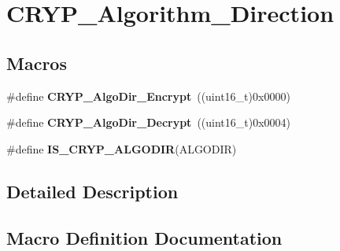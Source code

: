 \hypertarget{group___c_r_y_p___algorithm___direction}{}\section{C\+R\+Y\+P\+\_\+\+Algorithm\+\_\+\+Direction}
\label{group___c_r_y_p___algorithm___direction}
\subsection*{Macros}
\begin{DoxyCompactItemize}
\item 
\hypertarget{group___c_r_y_p___algorithm___direction_gafe38074cbbc3e45883962fd8d5698b4a}{}\#define {\bfseries C\+R\+Y\+P\+\_\+\+Algo\+Dir\+\_\+\+Encrypt}~((uint16\+\_\+t)0x0000)\label{group___c_r_y_p___algorithm___direction_gafe38074cbbc3e45883962fd8d5698b4a}

\item 
\hypertarget{group___c_r_y_p___algorithm___direction_gaaced3e33a4ee660cc07139481a90adb7}{}\#define {\bfseries C\+R\+Y\+P\+\_\+\+Algo\+Dir\+\_\+\+Decrypt}~((uint16\+\_\+t)0x0004)\label{group___c_r_y_p___algorithm___direction_gaaced3e33a4ee660cc07139481a90adb7}

\item 
\#define {\bfseries I\+S\+\_\+\+C\+R\+Y\+P\+\_\+\+A\+L\+G\+O\+D\+I\+R}(A\+L\+G\+O\+D\+I\+R)
\end{DoxyCompactItemize}


\subsection{Detailed Description}


\subsection{Macro Definition Documentation}
\hypertarget{group___c_r_y_p___algorithm___direction_ga6aeed434566ddf0c9a7c9f26a1abf1f3}{}
